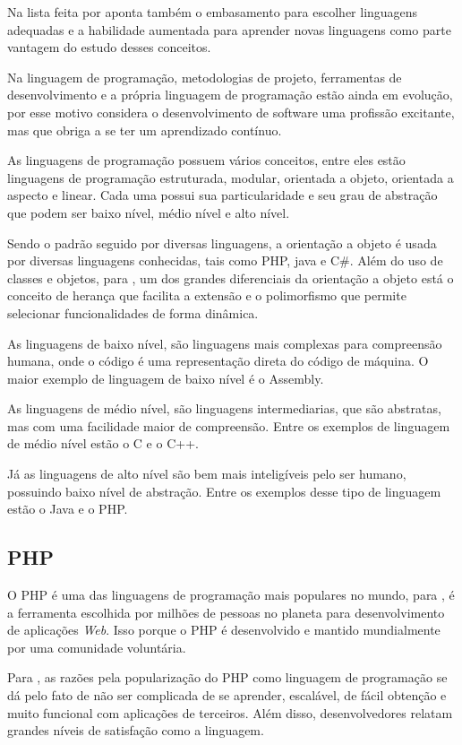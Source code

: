 Na lista feita por \cite{sebesta2011} aponta também o embasamento para escolher linguagens adequadas e a habilidade aumentada para aprender novas linguagens como parte vantagem do estudo desses conceitos.

Na linguagem de programação, metodologias de projeto, ferramentas de desenvolvimento e a própria linguagem de programação estão ainda em evolução, por esse motivo \cite{sebesta2011} considera o desenvolvimento de software uma profissão excitante, mas que obriga a se ter um aprendizado contínuo.

As linguagens de programação possuem vários conceitos, entre eles estão linguagens de programação estruturada, modular, orientada a objeto, orientada a aspecto e linear. Cada uma possui sua particularidade e seu grau de abstração que podem ser baixo nível, médio nível e alto nível.

Sendo o padrão seguido por diversas linguagens, a orientação a objeto é usada por diversas linguagens conhecidas, tais como PHP, java e C\#. Além do uso de classes e objetos, para \cite{ricarte2001}, um dos grandes diferenciais da orientação a objeto está o conceito de herança que facilita a extensão e o polimorfismo que permite selecionar funcionalidades de forma dinâmica.

As linguagens de baixo nível, são linguagens mais complexas para compreensão humana, onde o código é uma representação direta do código de máquina. O maior exemplo de linguagem de baixo nível é o Assembly.

As linguagens de médio nível, são linguagens intermediarias, que são abstratas, mas com uma facilidade maior de compreensão. Entre os exemplos de linguagem de médio nível estão o C e o C++.

Já as linguagens de alto nível são bem mais inteligíveis pelo ser humano, possuindo baixo nível de abstração. Entre os exemplos desse tipo de linguagem estão o Java e o PHP.

\subsection{PHP}
O PHP é uma das linguagens de programação mais populares no mundo, para \cite[p.2]{vaswani2010}, é a ferramenta  escolhida por milhões de pessoas no planeta para desenvolvimento de aplicações \textit{Web}. Isso porque o PHP é desenvolvido e mantido mundialmente por uma comunidade voluntária. 

Para \cite[p.2]{vaswani2010}, as razões pela popularização do PHP como linguagem de programação se dá pelo fato de não ser complicada de se aprender, escalável, de fácil obtenção e muito funcional com aplicações de terceiros. Além disso, desenvolvedores relatam grandes níveis de satisfação como a linguagem.

